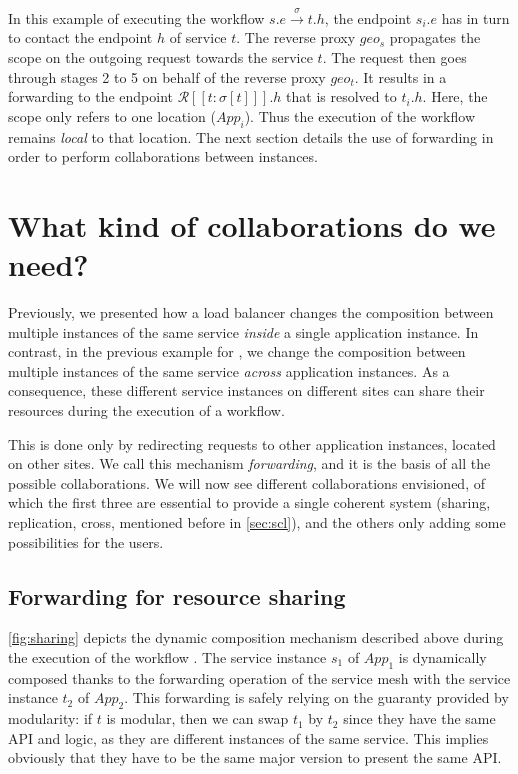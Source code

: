 In this example of executing the workflow $s.e \xrightarrow{\sigma}
t.h$, the endpoint $s_i.e$ has in turn to contact the endpoint $h$
of service $t$.
%
The reverse proxy $geo_s$ propagates the scope on the
outgoing request towards the service $t$.
%
The request then goes through stages 2 to 5 on behalf of the reverse
proxy $geo_t$.
%
It results in a forwarding to the endpoint
$\mathcal{R}[\![ t: \sigma[t] ]\!].h$ that is resolved to $t_i.h$.
%
Here, the scope only refers to one location (\ie $\mathit{App_i}$).
%
Thus the execution of the workflow remains \emph{local} to that
location.
%
The next section details the use of forwarding in order to
perform collaborations between instances.




\section{What kind of collaborations do we need?}
\label{sec:collaborations}



Previously, we presented how a load balancer changes the composition
between multiple instances of the same service \emph{inside} a single
application instance.
%
In contrast, in the previous example for \scl, we change the
composition between multiple instances of the same service
\emph{across} application instances.
%
As a consequence, these different service instances on different sites
can share their resources during the execution of a workflow.

This is done only by redirecting requests to other application
instances, located on other sites.
%
We call this mechanism \emph{forwarding}, and it is the basis of all
the possible collaborations.
%
We will now see different collaborations envisioned, of which the
first three are essential to provide a single coherent system
(sharing, replication, cross, mentioned before in \autoref{sec:scl}), and the others only
adding some possibilities for the users.

%

%

\subsection{Forwarding for resource sharing}
\label{ssec:scl-share}


\autoref{fig:sharing} depicts the dynamic composition mechanism
described above during the execution of the workflow
.
%
The service instance $s_1$ of $App_1$ is dynamically composed thanks
to the forwarding operation of the service mesh with the service
instance $t_2$ of $App_2$.
%
This forwarding is safely relying on the guaranty provided by
modularity: if $t$ is modular, then we can swap $t_1$ by $t_2$ since
they have the same API and logic, as they are different instances of
the same service.
%
This implies obviously that they have to be the same major version to
present the same API.
%


